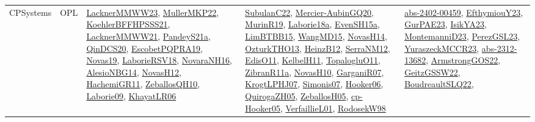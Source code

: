 {\begin{longtable}{lp{3cm}>{\raggedright}p{6cm}>{\raggedright}p{6cm}p{8cm}}
CPSystems & OPL & \href{articles/LacknerMMWW23.pdf}{LacknerMMWW23}\cite{LacknerMMWW23}, \href{articles/MullerMKP22.pdf}{MullerMKP22}\cite{MullerMKP22}, \href{articles/KoehlerBFFHPSSS21.pdf}{KoehlerBFFHPSSS21}\cite{KoehlerBFFHPSSS21}, \href{papers/LacknerMMWW21.pdf}{LacknerMMWW21}\cite{LacknerMMWW21}, \href{articles/PandeyS21a.pdf}{PandeyS21a}\cite{PandeyS21a}, \href{articles/QinDCS20.pdf}{QinDCS20}\cite{QinDCS20}, \href{articles/EscobetPQPRA19.pdf}{EscobetPQPRA19}\cite{EscobetPQPRA19}, \href{articles/Novas19.pdf}{Novas19}\cite{Novas19}, \href{articles/LaborieRSV18.pdf}{LaborieRSV18}\cite{LaborieRSV18}, \href{articles/NovaraNH16.pdf}{NovaraNH16}\cite{NovaraNH16}, \href{papers/AlesioNBG14.pdf}{AlesioNBG14}\cite{AlesioNBG14}, \href{articles/NovasH12.pdf}{NovasH12}\cite{NovasH12}, \href{articles/HachemiGR11.pdf}{HachemiGR11}\cite{HachemiGR11}, \href{articles/ZeballosQH10.pdf}{ZeballosQH10}\cite{ZeballosQH10}, \href{papers/Laborie09.pdf}{Laborie09}\cite{Laborie09}, \href{articles/KhayatLR06.pdf}{KhayatLR06}\cite{KhayatLR06} & \href{articles/SubulanC22.pdf}{SubulanC22}\cite{SubulanC22}, \href{papers/Mercier-AubinGQ20.pdf}{Mercier-AubinGQ20}\cite{Mercier-AubinGQ20}, \href{papers/MurinR19.pdf}{MurinR19}\cite{MurinR19}, \href{papers/Laborie18a.pdf}{Laborie18a}\cite{Laborie18a}, \href{articles/EvenSH15a.pdf}{EvenSH15a}\cite{EvenSH15a}, \href{papers/LimBTBB15.pdf}{LimBTBB15}\cite{LimBTBB15}, \href{articles/WangMD15.pdf}{WangMD15}\cite{WangMD15}, \href{articles/NovasH14.pdf}{NovasH14}\cite{NovasH14}, \href{articles/OzturkTHO13.pdf}{OzturkTHO13}\cite{OzturkTHO13}, \href{papers/HeinzB12.pdf}{HeinzB12}\cite{HeinzB12}, \href{papers/SerraNM12.pdf}{SerraNM12}\cite{SerraNM12}, \href{papers/EdisO11.pdf}{EdisO11}\cite{EdisO11}, \href{articles/KelbelH11.pdf}{KelbelH11}\cite{KelbelH11}, \href{articles/TopalogluO11.pdf}{TopalogluO11}\cite{TopalogluO11}, \href{papers/ZibranR11a.pdf}{ZibranR11a}\cite{ZibranR11a}, \href{articles/NovasH10.pdf}{NovasH10}\cite{NovasH10}, \href{papers/GarganiR07.pdf}{GarganiR07}\cite{GarganiR07}, \href{papers/KrogtLPHJ07.pdf}{KrogtLPHJ07}\cite{KrogtLPHJ07}, \href{articles/Simonis07.pdf}{Simonis07}\cite{Simonis07}, \href{articles/Hooker06.pdf}{Hooker06}\cite{Hooker06}, \href{papers/QuirogaZH05.pdf}{QuirogaZH05}\cite{QuirogaZH05}, \href{articles/ZeballosH05.pdf}{ZeballosH05}\cite{ZeballosH05}, \href{papers/cp-Hooker05.pdf}{cp-Hooker05}\cite{cp-Hooker05}, \href{papers/VerfaillieL01.pdf}{VerfaillieL01}\cite{VerfaillieL01}, \href{papers/RodosekW98.pdf}{RodosekW98}\cite{RodosekW98} & \href{articles/abs-2402-00459.pdf}{abs-2402-00459}\cite{abs-2402-00459}, \href{papers/EfthymiouY23.pdf}{EfthymiouY23}\cite{EfthymiouY23}, \href{articles/GurPAE23.pdf}{GurPAE23}\cite{GurPAE23}, \href{articles/IsikYA23.pdf}{IsikYA23}\cite{IsikYA23}, \href{articles/MontemanniD23.pdf}{MontemanniD23}\cite{MontemanniD23}, \href{papers/PerezGSL23.pdf}{PerezGSL23}\cite{PerezGSL23}, \href{articles/YuraszeckMCCR23.pdf}{YuraszeckMCCR23}\cite{YuraszeckMCCR23}, \href{articles/abs-2312-13682.pdf}{abs-2312-13682}\cite{abs-2312-13682}, \href{papers/ArmstrongGOS22.pdf}{ArmstrongGOS22}\cite{ArmstrongGOS22}, \href{papers/GeitzGSSW22.pdf}{GeitzGSSW22}\cite{GeitzGSSW22}, \href{papers/BoudreaultSLQ22.pdf}{BoudreaultSLQ22}\cite{BoudreaultSLQ22}, 
\end{longtable}}

